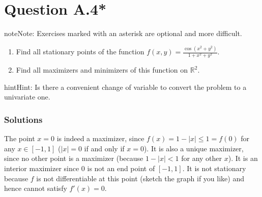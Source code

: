 \documentclass[letterpaper,10pt,english]{jupyterBook}
\begin{document}
\section{Question A.4*}
\label{\detokenize{02.exercises.A:question-a-4}}
\begin{sphinxadmonition}{note}{Note:}
\sphinxAtStartPar
Exercises marked with an asterisk \sphinxstylestrong{(*)} are optional and more difficult.
\end{sphinxadmonition}
\begin{enumerate}
%
\item {} 
\sphinxAtStartPar
Find all stationary points of the function
\(f(x, y) = \frac{\cos(x^2 + y^2)}{1 + x^2 + y^2}\).

\item {} 
\sphinxAtStartPar
Find all maximizers and minimizers of this function on \(\mathbb{R}^2\).

\end{enumerate}

\begin{sphinxadmonition}{hint}{Hint:}
\sphinxAtStartPar
Is there a convenient change of variable to convert the problem to a univariate one.
\end{sphinxadmonition}
\subsubsection*{Solutions}

\sphinxAtStartPar
{}

\sphinxAtStartPar
The point \(x=0\) is indeed a maximizer, since \(f(x) = 1 -|x| \leq 1 = f(0)\) for any \(x \in [-1, 1]\) (\(|x|=0\) if and only if \(x=0\)).
It is also a unique maximizer, since no other point is a maximizer (because \(1 -|x| < 1\) for any other \(x\)).
It is an interior maximizer since \(0\) is not an end point of \([-1, 1]\).
It is not stationary because \(f\) is not differentiable at this point (sketch the graph if you like) and hence cannot satisfy \(f'(x)=0\).

\sphinxAtStartPar
{}
\end{document}
